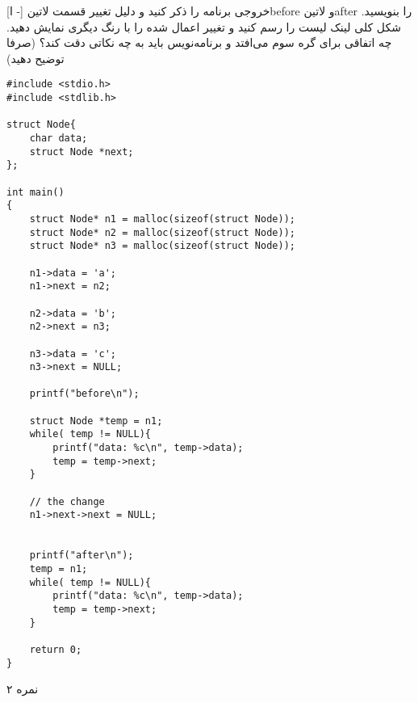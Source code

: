 \documentclass[../main.tex]{subfiles}
\begin{document}

[ا -]
     خروجی برنامه را ذکر کنید و دلیل تغییر قسمت ‌لاتین{before} و ‌لاتین{after} را بنویسید.
     شکل کلی لینک لیست را رسم کنید و تغییر اعمال شده را با رنگ دیگری نمایش دهید.
     چه اتفاقی برای گره سوم می‌افتد و برنامه‌نویس باید به چه نکاتی دقت کند؟ (صرفا توضیح دهید)

\begin{latin}
\begin{verbatim}
#include <stdio.h>
#include <stdlib.h>

struct Node{
    char data;
    struct Node *next;
};

int main()
{
    struct Node* n1 = malloc(sizeof(struct Node));
    struct Node* n2 = malloc(sizeof(struct Node));
    struct Node* n3 = malloc(sizeof(struct Node));

    n1->data = 'a';
    n1->next = n2;

    n2->data = 'b';
    n2->next = n3;

    n3->data = 'c';
    n3->next = NULL;

    printf("before\n");

    struct Node *temp = n1;
    while( temp != NULL){
        printf("data: %c\n", temp->data);
        temp = temp->next;
    }

    // the change
    n1->next->next = NULL;


    printf("after\n");
    temp = n1;
    while( temp != NULL){
        printf("data: %c\n", temp->data);
        temp = temp->next;
    }

    return 0;
}
\end{verbatim}
\end{latin}

۲ نمره
\end{document}
